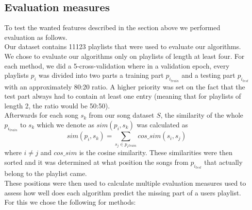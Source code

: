 \subsection{Evaluation measures}\label{ssec:evaluation_measures}
To test the wanted features described in the section above we performed evaluation as follows. \\
Our dataset contains 11123 playlists that were used to evaluate our algorithms. We chose to evaluate our algorithms only on playlists of length at least four. For each method, we did a 5-cross-validation where in a validation epoch, every playlists $p_i$ was divided into two parts a training part $p_{i_{train}}$ and a testing part $p_{i_{test}}$ with an approximately 80:20 ratio. A higher priority was set on the fact that the test part always had to contain at least one entry (meaning that for playlists of length 2, the ratio would be 50:50). \\
Afterwards for each song $ s_k $ from our song dataset $S$, the similarity of the whole $p_{i_{train}}$ to $s_k$ which we denote as $ sim(p_i, s_k) $ was calculated as $$ sim(p_i, s_k) =\sum_{s_j\in{p_i{_{train}}}} cos\_sim(s_i, s_j) $$ where $ i \neq j$ and $cos\_sim$ is the cosine similarity. These similarities were then sorted and it was determined at what position the songs from $p_{i_{test}} $ that actually belong to the playlist came. \\
These positions were then used to calculate multiple evaluation measures used to assess how well does each algorithm predict the missing part of a users playlist. For this we chose the following for methods:
